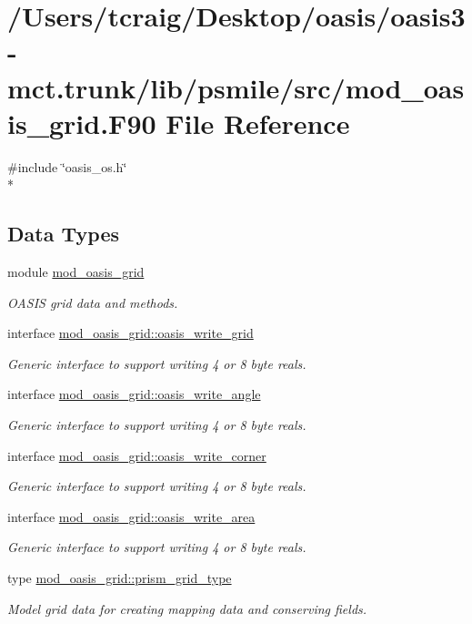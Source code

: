 \hypertarget{mod__oasis__grid_8_f90}{\section{/\+Users/tcraig/\+Desktop/oasis/oasis3-\/mct.trunk/lib/psmile/src/mod\+\_\+oasis\+\_\+grid.F90 File Reference}
\label{mod__oasis__grid_8_f90}
}
{\ttfamily \#include \char`\"{}oasis\+\_\+os.\+h\char`\"{}}\\*
\subsection*{Data Types}
\begin{DoxyCompactItemize}
\item 
module \hyperlink{classmod__oasis__grid}{mod\+\_\+oasis\+\_\+grid}
\begin{DoxyCompactList}\small\item\em O\+A\+S\+I\+S grid data and methods. \end{DoxyCompactList}\item 
interface \hyperlink{interfacemod__oasis__grid_1_1oasis__write__grid}{mod\+\_\+oasis\+\_\+grid\+::oasis\+\_\+write\+\_\+grid}
\begin{DoxyCompactList}\small\item\em Generic interface to support writing 4 or 8 byte reals. \end{DoxyCompactList}\item 
interface \hyperlink{interfacemod__oasis__grid_1_1oasis__write__angle}{mod\+\_\+oasis\+\_\+grid\+::oasis\+\_\+write\+\_\+angle}
\begin{DoxyCompactList}\small\item\em Generic interface to support writing 4 or 8 byte reals. \end{DoxyCompactList}\item 
interface \hyperlink{interfacemod__oasis__grid_1_1oasis__write__corner}{mod\+\_\+oasis\+\_\+grid\+::oasis\+\_\+write\+\_\+corner}
\begin{DoxyCompactList}\small\item\em Generic interface to support writing 4 or 8 byte reals. \end{DoxyCompactList}\item 
interface \hyperlink{interfacemod__oasis__grid_1_1oasis__write__area}{mod\+\_\+oasis\+\_\+grid\+::oasis\+\_\+write\+\_\+area}
\begin{DoxyCompactList}\small\item\em Generic interface to support writing 4 or 8 byte reals. \end{DoxyCompactList}\item 
type \hyperlink{structmod__oasis__grid_1_1prism__grid__type}{mod\+\_\+oasis\+\_\+grid\+::prism\+\_\+grid\+\_\+type}
\begin{DoxyCompactList}\small\item\em Model grid data for creating mapping data and conserving fields. \end{DoxyCompactList}\end{DoxyCompactItemize}
